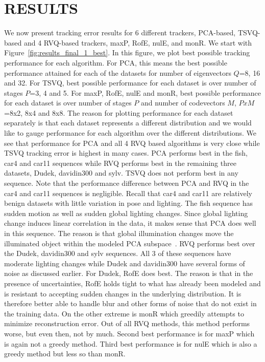 \documentclass{article}
\begin{document}
\section{RESULTS}
We now present tracking error results for 6 different trackers, PCA-based, TSVQ-based and 4 RVQ-based trackers, maxP, RofE, nulE, and monR.  We start with Figure~\ref{fig:results_final_1_best}.  In this figure, we plot best possible tracking performance for each algorithm.  For PCA, this means the best possible performance attained for each of the datasets for number of eigenvectors $Q$=8, 16 and 32.  For TSVQ, best possible performance for each dataset is over number of stages $P$=3, 4 and 5.  For maxP, RofE, nulE and monR, best possible performance for each dataset is over number of stages $P$ and number of codevectors $M$, $PxM$=8x2, 8x4 and 8x8.  The reason for plotting performance for each dataset separately is that each dataset represents a different distribution and we would like to gauge performance for each algorithm over the different distributions.  We see that performance for PCA and all 4 RVQ based algorithms is very close while TSVQ tracking error is highest in many cases.  PCA performs best in the fish, car4 and car11 sequences while RVQ performs best in the remaining three datasets, Dudek, davidin300 and sylv.  TSVQ does not perform best in any sequence.  Note that the performance difference between PCA and RVQ in the car4 and car11 sequences is negligible.  Recall that car4 and car11 are relatively benign datasets with little variation in pose and lighting.  The fish sequence has sudden motion as well as sudden global lighting changes.   Since global lighting change induces linear correlation in the data, it makes sense that PCA does well in this sequence.  The reason is that global illumination changes move the illuminated object within the modeled PCA subspace~\cite{1987_JNL_Faces_Sirovich}.  RVQ performs best over the Dudek, davidin300 and sylv sequences.  All 3 of these sequences have moderate lighting changes while Dudek and davidin300 have several forms of noise as discussed earlier.  For Dudek, RofE does best.  The reason is that in the presence of uncertainties, RofE holds tight to what has already been modeled and is resistant to accepting sudden changes in the underlying distribution.  It is therefore better able to handle blur and other forms of noise that do not exist in the training data.  On the other extreme is monR which greedily attempts to minimize reconstruction error.  Out of all RVQ methods, this method performs worse, but even then, not by much.  Second best performance is for maxP which is again not a greedy method.  Third best performance is for nulE which is also a greedy method but less so than monR.
\end{document}
